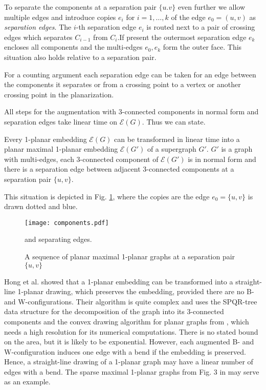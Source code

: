 \documentclass[runningheads]{llncs}
\begin{document}
To separate the components at a separation pair $\{u.v\}$ even
further we allow multiple edges and introduce copies $e_i$ for $i=1,
\ldots, k$ of the edge $e_0 = (u,v)$  as \emph{separation edges}.
The $i$-th separation edge $e_i$ is routed next to a pair of
crossing edges which separates $C_{i-1}$ from $C_i$.If present the
outermost separation edge $e_k$ encloses all components and the
multi-edges $e_0, e_k$ form the outer face. This situation also
holds relative to a separation pair.

For a counting argument each separation edge can be taken for an
edge between the components it separates or from a crossing point to
a  vertex or another crossing point in the planarization.

All steps for the augmentation with 3-connected components in normal
form and separation edges take linear time on $\mathcal{E}(G)$. Thus
we can state.


\begin{lemma}
Every 1-planar embedding $\mathcal{E}(G)$ can be transformed in
linear time into a planar maximal 1-planar embedding
$\mathcal{E}(G')$ of a supergraph $G'$. $G'$ is a graph with
multi-edges, each 3-connected component of $\mathcal{E}(G')$ is in
normal form and there is a separation edge between  adjacent
$3$-connected components at a separation pair $\{ u,v \}$.
\end{lemma}


This situation is depicted in Fig. \ref{Fig:separation}, where the
copies are the edge $e_0 = \{u,v\}$ is drawn dotted and blue.


\begin{figure}
   \begin{center}
     \texttt{[image: components.pdf]}
     \caption{A sequence of planar maximal 1-planar graphs at a separation pair $\{u,v\}$}
     and separating edges.
     \label{Fig:separation}
   \end{center}
\end{figure}


Hong et al. \cite{help-ft1pg-12} showed that a 1-planar embedding
can be transformed into a straight-line 1-planar drawing, which
preserves the embedding, provided there are no B- and
W-configurations. Their algorithm is quite complex and uses the
SPQR-tree data structure for the decomposition of the graph into its
3-connected components and the convex drawing algorithm for planar
graphs from \cite{cyn-lacdpg-84}, which needs a high resolution for
its numerical computations. There is no stated bound on the area,
but it is likely to be exponential. However, each augmented B- and
W-configuration induces one edge with a bend if the embedding is
preserved. Hence, a straight-line drawing of a 1-planar graph may
have a linear number of edges with a bend. The sparse maximal
1-planar graphs  from Fig. 3 in \cite{begghr-odm1p-13} may serve as
an example.
\end{document}
